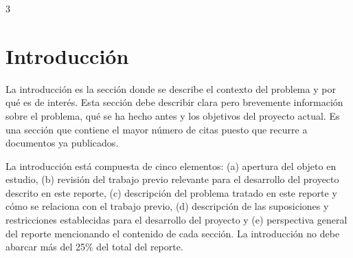 \documentclass{article}
\begin{document}
\fontsize{30}{36}\selectfont
\setlength{\columnsep}{1cm}
\begin{multicols}{3}
\noindent
{}
\section*{Introducción}

\noindent La introducción es la sección donde se describe el contexto del problema y por qué es de interés. Esta sección debe describir clara pero brevemente información sobre el problema, qué se ha hecho antes y los objetivos del proyecto actual. Es una sección que contiene el mayor número de citas puesto que recurre a documentos ya publicados.

La introducción está compuesta de cinco elementos: (a) apertura del objeto en estudio, (b) revisión del trabajo previo relevante para el desarrollo del proyecto descrito en este reporte, (c) descripción del problema tratado en este reporte y cómo se relaciona con el trabajo previo, (d) descripción de las suposiciones y restricciones establecidas para el desarrollo del proyecto y (e) perspectiva general del reporte mencionando el contenido de cada sección. La introducción no debe abarcar más del 25\% del total del reporte.


\end{multicols}
\end{document}
